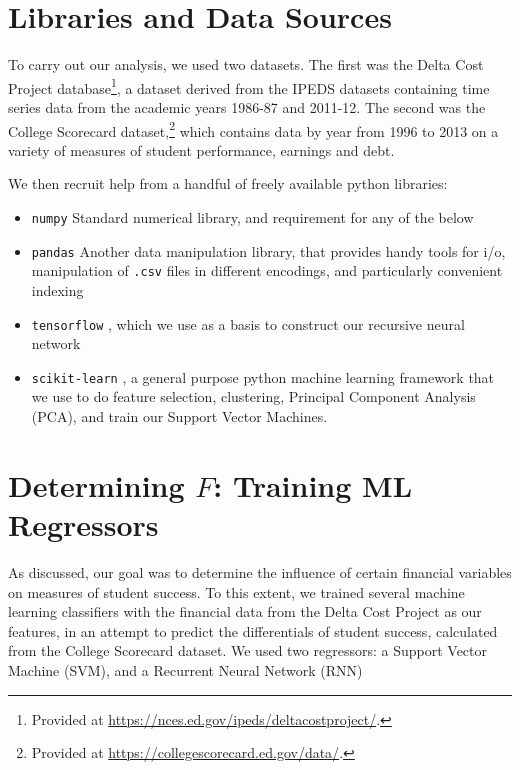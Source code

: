 \documentclass[paper.tex]{subfiles}
\begin{document}
\section{Libraries and Data Sources}
To carry out our analysis, we used two datasets. The first was the Delta Cost Project database\footnote{Provided at \url{https://nces.ed.gov/ipeds/deltacostproject/}.}, a dataset derived from the IPEDS datasets containing time series data from the academic years 1986-87 and 2011-12. The second was the College Scorecard dataset,\footnote{Provided at \url{https://collegescorecard.ed.gov/data/}.} which contains data by year from 1996 to 2013 on a variety of measures of student performance, earnings and debt. 

We then recruit help from a handful of freely available python libraries: 
\begin{itemize}
	\setlength{\itemsep}{-0.3em}
	\item \texttt{numpy} Standard numerical library, and requirement for any of the below
	\item \texttt{pandas} Another data manipulation library, that provides handy tools for i/o, manipulation of \texttt{.csv} files in different encodings, and particularly convenient indexing
	\item \texttt{tensorflow} \cite{tensorflow}, which we use as a basis to construct our recursive neural network 
	\item \texttt{scikit-learn} \cite{scikit-learn}, a general purpose python machine learning framework that we use to do feature selection, clustering, Principal Component Analysis (PCA), and train our Support Vector Machines.
\end{itemize}

\section{Determining $F$: Training ML Regressors}
As discussed, our goal was to determine the influence of certain financial variables on measures of student success. To this extent, we trained several machine learning classifiers with the financial data from the Delta Cost Project as our features, in an attempt to predict the differentials of student success, calculated from the College Scorecard dataset. We used two regressors: a Support Vector Machine (SVM), and a Recurrent Neural Network (RNN)
\end{document}
